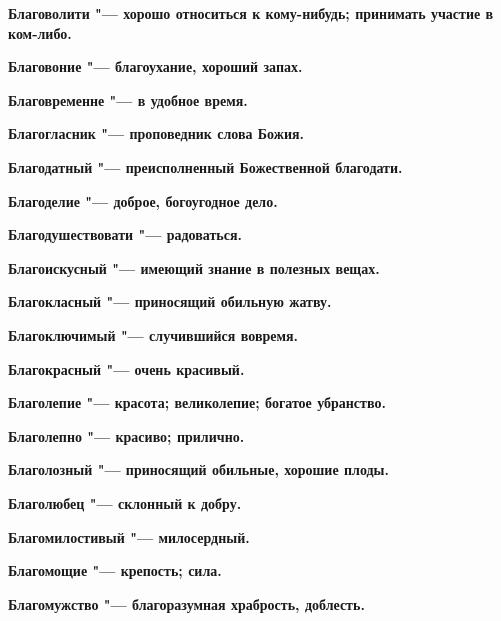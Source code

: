 \begin{mymulticols}{2}
\bfseries Благоволити\normalfont{} "--- хорошо относиться к кому-нибудь; принимать участие в ком-либо. 




\bfseries Благовоние\normalfont{} "--- благоухание, хороший запах. 




\bfseries Благовременне\normalfont{} "--- в удобное время. 




\bfseries Благогласник\normalfont{} "--- проповедник слова Божия. 




\bfseries Благодатный\normalfont{} "--- преисполненный Божественной благодати. 




\bfseries Благоделие\normalfont{} "--- доброе, богоугодное дело. 




\bfseries Благодушествовати\normalfont{} "--- радоваться. 




\bfseries Благоискусный\normalfont{} "--- имеющий знание в полезных вещах. 




\bfseries Благокласный\normalfont{} "--- приносящий обильную жатву. 




\bfseries Благоключимый\normalfont{} "--- случившийся вовремя. 




\bfseries Благокрасный\normalfont{} "--- очень красивый. 




\bfseries Благолепие\normalfont{} "--- красота; великолепие; богатое убранство. 




\bfseries Благолепно\normalfont{} "--- красиво; прилично. 




\bfseries Благолозный\normalfont{} "--- приносящий обильные, хорошие плоды. 




\bfseries Благолюбец\normalfont{} "--- склонный к добру. 




\bfseries Благомилостивый\normalfont{} "--- милосердный. 




\bfseries Благомощие\normalfont{} "--- крепость; сила. 




\bfseries Благомужство\normalfont{} "--- благоразумная храбрость, доблесть. 





\end{mymulticols}
